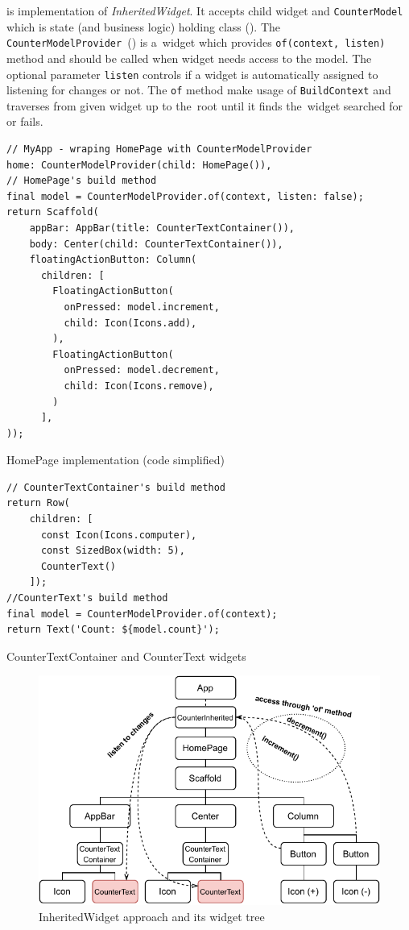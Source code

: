  is implementation of \textit{InheritedWidget}. It accepts child widget and \verb|CounterModel| which is state (and business logic) holding class (). The \verb|CounterModelProvider|~() is a~widget which provides \verb|of(context, listen)| method and should be called when widget needs access to the model. The optional parameter \verb|listen| controls if a widget is automatically assigned to listening for changes or not. The \verb|of| method make usage of \verb|BuildContext| and traverses from given widget up to the~root until it finds the~widget searched for or fails. 

\begin{listing}[ht]
\begin{verbatim}
// MyApp - wraping HomePage with CounterModelProvider
home: CounterModelProvider(child: HomePage()),
// HomePage's build method
final model = CounterModelProvider.of(context, listen: false);
return Scaffold(
    appBar: AppBar(title: CounterTextContainer()),
    body: Center(child: CounterTextContainer()),
    floatingActionButton: Column(
      children: [
        FloatingActionButton(
          onPressed: model.increment,
          child: Icon(Icons.add),
        ),
        FloatingActionButton(
          onPressed: model.decrement,
          child: Icon(Icons.remove),
        )
      ],
));
\end{verbatim}
\caption{HomePage implementation (code simplified)}
\label{listing:counter-inherited-homepage}
\end{listing}

\begin{listing}[ht]
\begin{verbatim}
// CounterTextContainer's build method
return Row(
    children: [
      const Icon(Icons.computer),
      const SizedBox(width: 5),
      CounterText()
    ]);
//CounterText's build method
final model = CounterModelProvider.of(context);
return Text('Count: ${model.count}');
\end{verbatim}
\caption{CounterTextContainer and CounterText widgets}
\label{listing:counter-inherited-text-container}
\end{listing}

\begin{figure}[htp]
    \centering
    \includegraphics[width=0.75\linewidth]{img/flutter/counter-inherited-widget.pdf}
    \caption{InheritedWidget approach and its widget tree}
    \label{fig:counter-app-inherited-widget}
\end{figure}

